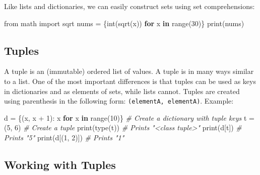 \documentclass[
]{article}
\newenvironment{Shaded}{}{}
\newcommand{\BuiltInTok}[1]{#1}
\newcommand{\CommentTok}[1]{\textcolor[rgb]{0.38,0.63,0.69}{\textit{#1}}}
\newcommand{\ControlFlowTok}[1]{\textcolor[rgb]{0.00,0.44,0.13}{\textbf{#1}}}
\newcommand{\DecValTok}[1]{\textcolor[rgb]{0.25,0.63,0.44}{#1}}
\newcommand{\ImportTok}[1]{#1}
\newcommand{\KeywordTok}[1]{\textcolor[rgb]{0.00,0.44,0.13}{\textbf{#1}}}
\newcommand{\NormalTok}[1]{#1}
\newcommand{\OperatorTok}[1]{\textcolor[rgb]{0.40,0.40,0.40}{#1}}
\begin{document}
Like lists and dictionaries, we can easily construct sets using set
comprehensions:

\begin{Shaded}
\begin{Highlighting}[]
\ImportTok{from}\NormalTok{ math }\ImportTok{import}\NormalTok{ sqrt}
\NormalTok{nums }\OperatorTok{=}\NormalTok{ \{}\BuiltInTok{int}\NormalTok{(sqrt(x)) }\ControlFlowTok{for}\NormalTok{ x }\KeywordTok{in} \BuiltInTok{range}\NormalTok{(}\DecValTok{30}\NormalTok{)\}}
\BuiltInTok{print}\NormalTok{(nums)}
\end{Highlighting}
\end{Shaded}

\hypertarget{tuples}{%
\subsection{Tuples}\label{tuples}}

A tuple is an (immutable) ordered list of values. A tuple is in many
ways similar to a list. One of the most important differences is that
tuples can be used as keys in dictionaries and as elements of sets,
while lists cannot. Tuples are created using parenthesis in the
following form: \texttt{(elementA,\ elementA)}. Example:

\begin{Shaded}
\begin{Highlighting}[]
\NormalTok{d }\OperatorTok{=}\NormalTok{ \{(x, x }\OperatorTok{+} \DecValTok{1}\NormalTok{): x }\ControlFlowTok{for}\NormalTok{ x }\KeywordTok{in} \BuiltInTok{range}\NormalTok{(}\DecValTok{10}\NormalTok{)\}  }\CommentTok{\# Create a dictionary with tuple keys}
\NormalTok{t }\OperatorTok{=}\NormalTok{ (}\DecValTok{5}\NormalTok{, }\DecValTok{6}\NormalTok{)                              }\CommentTok{\# Create a tuple}
\BuiltInTok{print}\NormalTok{(}\BuiltInTok{type}\NormalTok{(t))                          }\CommentTok{\# Prints "\textless{}class \textquotesingle{}tuple\textquotesingle{}\textgreater{}"}
\BuiltInTok{print}\NormalTok{(d[t])                             }\CommentTok{\# Prints "5"}
\BuiltInTok{print}\NormalTok{(d[(}\DecValTok{1}\NormalTok{, }\DecValTok{2}\NormalTok{)])                        }\CommentTok{\# Prints "1"}
\end{Highlighting}
\end{Shaded}

\hypertarget{working-with-tuples}{%
\subsection{Working with Tuples}\label{working-with-tuples}}
\end{document}
